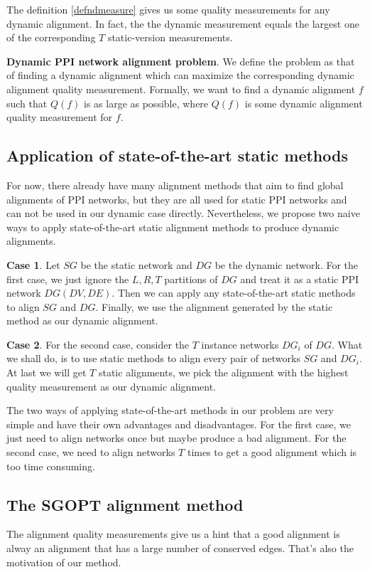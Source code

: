 \documentclass{bioinfo}
\theoremstyle{definition}
\begin{document}
\begin{methods}
The definition \ref{defndmeasure} gives us some quality measurements for any dynamic alignment. In fact, the the dynamic measurement equals the largest one of the corresponding $T$ static-version measurements.

\textbf{Dynamic PPI network alignment problem}. We define the problem as that of finding a dynamic alignment which can maximize the corresponding dynamic alignment quality measurement. Formally, we want to find a dynamic alignment $f$ such that $Q(f)$ is as large as possible, where $Q(f)$ is some dynamic alignment quality measurement for $f$.

\subsection{Application of state-of-the-art static methods}
For now, there already have many alignment methods that aim to find global alignments of PPI networks, but they are all used for static PPI networks and can not be used in our dynamic case directly. Nevertheless, we propose two naive ways to apply state-of-the-art static alignment methods to produce dynamic alignments.

\textbf{Case 1}. Let $SG$ be the static network and $DG$ be the dynamic network. For the first case, we just ignore the $L,R,T$ partitions of $DG$ and treat it as a static PPI network $DG(DV,DE)$. Then we can apply any state-of-the-art static methods to align $SG$ and $DG$. Finally, we use the alignment generated by the static method as our dynamic alignment.

\textbf{Case 2}. For the second case, consider the $T$ instance networks $DG_i$ of $DG$. What we shall do, is to use static methods to align every pair of networks $SG$ and $DG_i$. At last we will get $T$ static alignments, we pick the alignment with the highest quality measurement as our dynamic alignment.

The two ways of applying state-of-the-art methods in our problem are very simple and have their own advantages and disadvantages. For the first case, we just need to align networks once but maybe produce a bad alignment. For the second case, we need to align networks $T$ times to get a good alignment which is too time consuming.

\subsection{The SGOPT alignment method}
The alignment quality measurements give us a hint that a good alignment is alway an alignment that has a large number of conserved edges. That's also the motivation of our method.


\end{methods}
\end{document}
